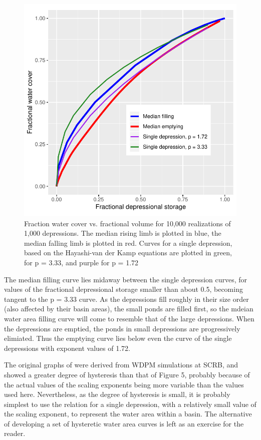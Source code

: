 \documentclass[draft,linenumbers]{agujournal2018}
\begin{document}
\begin{figure}[h]
\includegraphics[width=1\linewidth,]{figures/filling_emptying_water_areas} \caption{Fraction water cover vs. fractional volume for 10,000 realizations of 1,000 depressions. The median rising limb is plotted in blue, the median falling limb is plotted in red. Curves
for a single depression, based on the Hayashi-van der Kamp equations are plotted in green, 
for p = 3.33, and purple for p = 1.72}\label{fig:unnamed-chunk-5}
\end{figure}

The median filling curve lies midaway between the single depression
curves, for values of the fractional depressional storage smaller than
about 0.5, becoming tangent to the p = 3.33 curve. As the depressions
fill roughly in their size order (also affected by their basin areas),
the small ponds are filled first, so the mdeian water area filling curve
will come to resemble that of the large depressions. When the
depressions are emptied, the ponds in small depressions are
progressively elimiated. Thus the emptying curve lies below even the
curve of the single depressions with exponent values of 1.72.

The original graphs of \citet{shookMemoryEffectsDepressional2011} were
derived from WDPM simulations at SCRB, and showed a greater degree of
hysteresis than that of Figure 5, probably because of the actual values
of the scaling exponents being more variable than the values used here.
Nevertheless, as the degree of hysteresis is small, it is probably
simplest to use the relation for a single depression, with a relatively
small value of the scaling exponent, to represent the water area within
a basin. The alternative of developing a set of hysteretic water area
curves is left as an exercise for the reader.
\end{document}
